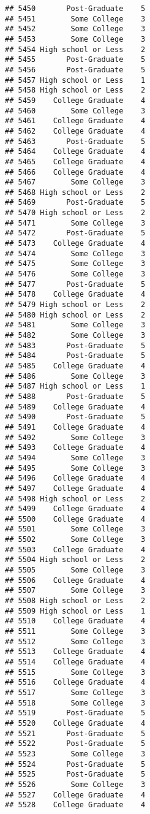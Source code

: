 \documentclass[
]{article}
\begin{document}
\begin{verbatim}
## 5450       Post-Graduate    5
## 5451        Some College    3
## 5452        Some College    3
## 5453        Some College    3
## 5454 High school or Less    2
## 5455       Post-Graduate    5
## 5456       Post-Graduate    5
## 5457 High school or Less    1
## 5458 High school or Less    2
## 5459    College Graduate    4
## 5460        Some College    3
## 5461    College Graduate    4
## 5462    College Graduate    4
## 5463       Post-Graduate    5
## 5464    College Graduate    4
## 5465    College Graduate    4
## 5466    College Graduate    4
## 5467        Some College    3
## 5468 High school or Less    2
## 5469       Post-Graduate    5
## 5470 High school or Less    2
## 5471        Some College    3
## 5472       Post-Graduate    5
## 5473    College Graduate    4
## 5474        Some College    3
## 5475        Some College    3
## 5476        Some College    3
## 5477       Post-Graduate    5
## 5478    College Graduate    4
## 5479 High school or Less    2
## 5480 High school or Less    2
## 5481        Some College    3
## 5482        Some College    3
## 5483       Post-Graduate    5
## 5484       Post-Graduate    5
## 5485    College Graduate    4
## 5486        Some College    3
## 5487 High school or Less    1
## 5488       Post-Graduate    5
## 5489    College Graduate    4
## 5490       Post-Graduate    5
## 5491    College Graduate    4
## 5492        Some College    3
## 5493    College Graduate    4
## 5494        Some College    3
## 5495        Some College    3
## 5496    College Graduate    4
## 5497    College Graduate    4
## 5498 High school or Less    2
## 5499    College Graduate    4
## 5500    College Graduate    4
## 5501        Some College    3
## 5502        Some College    3
## 5503    College Graduate    4
## 5504 High school or Less    2
## 5505        Some College    3
## 5506    College Graduate    4
## 5507        Some College    3
## 5508 High school or Less    2
## 5509 High school or Less    1
## 5510    College Graduate    4
## 5511        Some College    3
## 5512        Some College    3
## 5513    College Graduate    4
## 5514    College Graduate    4
## 5515        Some College    3
## 5516    College Graduate    4
## 5517        Some College    3
## 5518        Some College    3
## 5519       Post-Graduate    5
## 5520    College Graduate    4
## 5521       Post-Graduate    5
## 5522       Post-Graduate    5
## 5523        Some College    3
## 5524       Post-Graduate    5
## 5525       Post-Graduate    5
## 5526        Some College    3
## 5527    College Graduate    4
## 5528    College Graduate    4

\end{verbatim}
\end{document}
